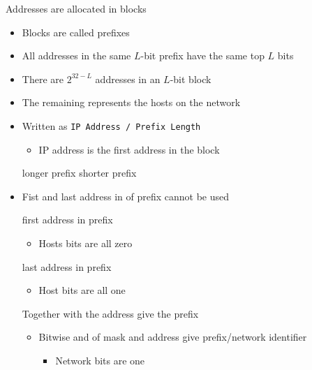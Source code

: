 \begin{itemize}
\begin{itemize}
\begin{itemize}
                \end{itemize}
             Addresses are allocated in blocks
                \begin{itemize}
                    \item Blocks are called prefixes
                    \item All addresses in the same $L$-bit prefix have the same top $L$ bits
                    \item There are $2^{32 - L}$ addresses in an $L$-bit block
                    \item The remaining represents the hosts on the network
                    \item Written as \verb+IP Address / Prefix Length+
                        \begin{itemize}
                            \item IP address is the first address in the block
                        \end{itemize}
                     longer prefix
                     shorter prefix
                    \item Fist and last address in of prefix cannot be used
                        \begin{itemize}
                             first address in prefix
                                \begin{itemize}
                                    \item Hosts bits are all zero
                                \end{itemize}
                             last address in prefix
                                \begin{itemize}
                                    \item Host bits are all one
                                \end{itemize}
                        \end{itemize}
                     Together with the address give the prefix
                        \begin{itemize}
                            \item Bitwise and of mask and address give prefix/network identifier
                                \begin{itemize}
                                    \item Network bits are one

\end{itemize}
\end{itemize}
\end{itemize}
\end{itemize}
\end{itemize}
